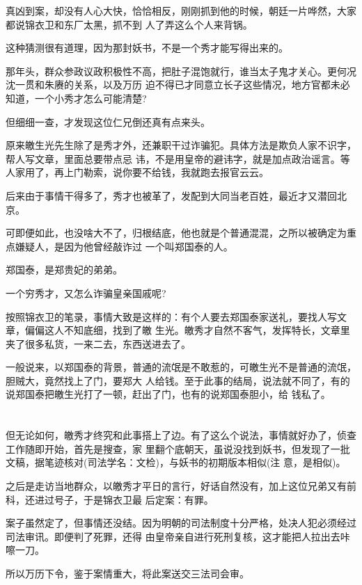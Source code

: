 \documentclass[11pt,a4paper,onecolumn]{article}
\begin{document}
真凶到案，却没有人心大快，恰恰相反，刚刚抓到他的时候，朝廷一片哗然，大家都说锦衣卫和东厂太黑，抓不到
人了弄这么个人来背锅。

这种猜测很有道理，因为那封妖书，不是一个秀才能写得出来的。

那年头，群众参政议政积极性不高，把肚子混饱就行，谁当太子鬼才关心。更何况沈一贯和朱赓的关系，以及万历
迫不得已才同意立长子这些情况，地方官都未必知道，一个小秀才怎么可能清楚?

但细细一查，才发现这位仁兄倒还真有点来头。

原来皦生光先生除了是秀才外，还兼职干过诈骗犯。具体方法是欺负人家不识字，帮人写文章，里面总要带点忌
讳，不是用皇帝的避讳字，就是加点政治谣言。等人家用了，再上门勒索，说你要不给钱，我就跑去报官云云。

后来由于事情干得多了，秀才也被革了，发配到大同当老百姓，最近才又潜回北京。

可即便如此，也没啥大不了，归根结底，他也就是个普通混混，之所以被确定为重点嫌疑人，是因为他曾经敲诈过
一个叫郑国泰的人。

郑国泰，是郑贵妃的弟弟。

一个穷秀才，又怎么诈骗皇亲国戚呢?

按照锦衣卫的笔录，事情大致是这样的：有个人要去郑国泰家送礼，要找人写文章，偏偏这人不知底细，找到了皦
生光。皦秀才自然不客气，发挥特长，文章里夹了很多私货，一来二去，东西送进去了。

一般说来，以郑国泰的背景，普通的流氓是不敢惹的，可皦生光不是普通的流氓，胆贼大，竟然找上了门，要郑大
人给钱。至于此事的结局，说法就不同了，有的说郑国泰把皦生光打了一顿，赶出了门，也有的说郑国泰胆小，给
钱私了。

\section[\thesection]{}

但无论如何，皦秀才终究和此事搭上了边。有了这么个说法，事情就好办了，侦查工作随即开始，首先是搜查，家
里翻个底朝天，虽说没找到妖书，但发现了一批文稿，据笔迹核对(司法学名：文检)，与妖书的初期版本相似(注
意，是相似)。

之后是走访当地群众，以皦秀才平日的言行，好话自然没有，加上这位兄弟又有前科，还进过号子，于是锦衣卫最
后定案：有罪。

案子虽然定了，但事情还没结。因为明朝的司法制度十分严格，处决人犯必须经过司法审讯。即便判了死罪，还得
由皇帝亲自进行死刑复核，这才能把人拉出去咔嚓一刀。

所以万历下令，鉴于案情重大，将此案送交三法司会审。
\end{document}
